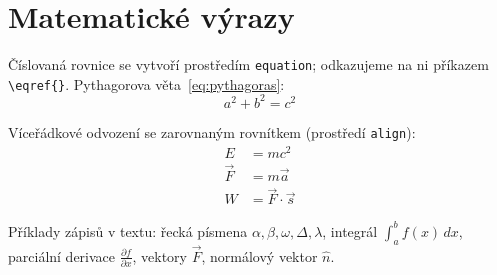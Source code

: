 
\section{Matematické výrazy}

Číslovaná rovnice se vytvoří prostředím \texttt{equation}; odkazujeme na ni příkazem \verb|\eqref{}|.
Pythagorova věta~\eqref{eq:pythagoras}:
\begin{equation}
	a^2 + b^2 = c^2
	\label{eq:pythagoras}
\end{equation}

Víceřádkové odvození se zarovnaným rovnítkem (prostředí \texttt{align}):
\begin{align}
	E         &= mc^2 \\
	\vec{F}   &= m\vec{a} \\
	W         &= \vec{F} \cdot \vec{s}
\end{align}

Příklady zápisů v textu: řecká písmena $\alpha, \beta, \omega, \Delta, \lambda$,
integrál $\int_a^b f(x)\,dx$, parciální derivace $\frac{\partial f}{\partial x}$,
vektory $\vec{F}$, normálový vektor $\hat{n}$.

